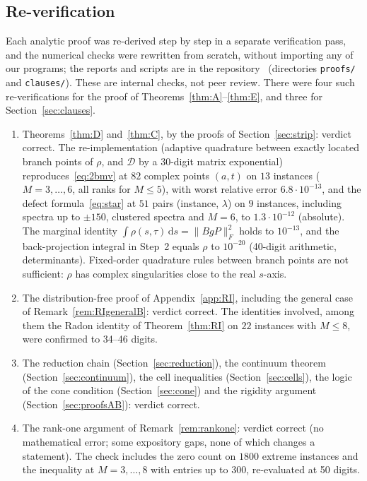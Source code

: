 \documentclass[11pt]{amsart}
\theoremstyle{definition}
\theoremstyle{remark}
\numberwithin{equation}{section}
\newcommand{\cD}{\mathcal{D}}
\newcommand{\dd}{\,\mathrm{d}}
\begin{document}
\subsection{Re-verification}\label{subsec:independent}
Each analytic proof was re-derived step by step in a separate verification pass, and the numerical checks were rewritten
from scratch, without importing any of our programs; the reports and scripts are in the repository~\cite{repo-oqp27}
(directories \texttt{proofs/} and \texttt{clauses/}). These are internal checks, not peer review. There were four such
re-verifications for the proof of Theorems~\ref{thm:A}--\ref{thm:E}, and three for Section~\ref{sec:clauses}.
\begin{enumerate}
\item Theorems~\ref{thm:D} and~\ref{thm:C}, by the proofs of Section~\ref{sec:strip}: verdict correct. The
re-implementation (adaptive quadrature between exactly located branch points of $\rho$, and $\cD$ by a 30-digit matrix
exponential) reproduces~\eqref{eq:2bmv} at $82$ complex points $(a,t)$ on $13$ instances ($M=3,\dots,6$, all ranks for
$M\le5$), with worst relative error $6.8\cdot10^{-13}$, and the defect formula~\eqref{eq:star} at $51$ pairs (instance,
$\lambda$) on $9$ instances, including spectra up to $\pm150$, clustered spectra and $M=6$, to $1.3\cdot10^{-12}$
(absolute). The marginal identity $\int\rho(s,\tau)\dd s=\|BgP\|_F^2$ holds to $10^{-13}$, and the back-projection
integral in Step~2 equals $\rho$ to $10^{-20}$ (40-digit arithmetic, determinants). Fixed-order quadrature rules between
branch points are not sufficient: $\rho$ has complex singularities close to the real $s$-axis.
\item The distribution-free proof of Appendix~\ref{app:RI}, including the general case of
Remark~\ref{rem:RIgeneralB}: verdict correct. The identities involved, among them the Radon identity of
Theorem~\ref{thm:RI} on $22$ instances with $M\le8$, were confirmed to 34--46 digits.
\item The reduction chain (Section~\ref{sec:reduction}), the continuum theorem (Section~\ref{sec:continuum}), the cell
inequalities (Section~\ref{sec:cells}), the logic of the cone condition (Section~\ref{sec:cone}) and the rigidity argument
(Section~\ref{sec:proofsAB}): verdict correct.
\item The rank-one argument of Remark~\ref{rem:rankone}: verdict correct (no mathematical error; some expository gaps,
none of which changes a statement). The check includes the zero count on $1800$
extreme instances and the inequality at $M=3,\dots,8$ with entries up to $300$, re-evaluated at 50 digits.

\end{enumerate}
\end{document}
